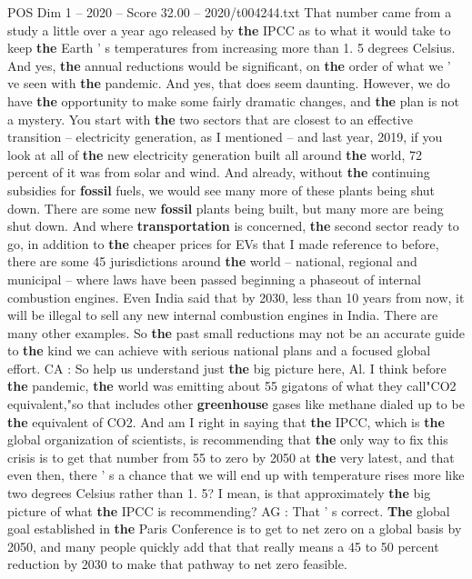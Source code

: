 \begin{textsample}{POS Dim 1 – 2020 – Score 32.00 – 2020/t004244.txt}
That number came from a study a little over a year ago released by \textbf{the} IPCC as to what it would take to keep \textbf{the} Earth ' s temperatures from increasing more than 1. 5 degrees Celsius.
And yes, \textbf{the} annual reductions would be significant, on \textbf{the} order of what we ' ve seen with \textbf{the} pandemic.
And yes, that does seem daunting.
However, we do have \textbf{the} opportunity to make some fairly dramatic changes, and \textbf{the} plan is not a mystery.
You start with \textbf{the} two sectors that are closest to an effective transition -- electricity generation, as I mentioned -- and last year, 2019, if you look at all of \textbf{the} new electricity generation built all around \textbf{the} world, 72 percent of it was from solar and wind.
And already, without \textbf{the} continuing subsidies for \textbf{fossil} fuels, we would see many more of these plants being shut down.
There are some new \textbf{fossil} plants being built, but many more are being shut down.
And where \textbf{transportation} is concerned, \textbf{the} second sector ready to go, in addition to \textbf{the} cheaper prices for EVs that I made reference to before, there are some 45 jurisdictions around \textbf{the} world -- national, regional and municipal -- where laws have been passed beginning a phaseout of internal combustion engines.
Even India said that by 2030, less than 10 years from now, it will be illegal to sell any new internal combustion engines in India.
There are many other examples.
So \textbf{the} past small reductions may not be an accurate guide to \textbf{the} kind we can achieve with serious national plans and a focused global effort.
CA : So help us understand just \textbf{the} big picture here, Al.
I think before \textbf{the} pandemic, \textbf{the} world was emitting about 55 gigatons of what they call"CO2 equivalent,"so that includes other \textbf{greenhouse} gases like methane dialed up to be \textbf{the} equivalent of CO2.
And am I right in saying that \textbf{the} IPCC, which is \textbf{the} global organization of scientists, is recommending that \textbf{the} only way to fix this crisis is to get that number from 55 to zero by 2050 at \textbf{the} very latest, and that even then, there ' s a chance that we will end up with temperature rises more like two degrees Celsius rather than 1. 5?
I mean, is that approximately \textbf{the} big picture of what \textbf{the} IPCC is recommending?
AG : That ' s correct. \textbf{The} global goal established in \textbf{the} Paris Conference is to get to net zero on a global basis by 2050, and many people quickly add that that really means a 45 to 50 percent reduction by 2030 to make that pathway to net zero feasible.

\end{textsample}
